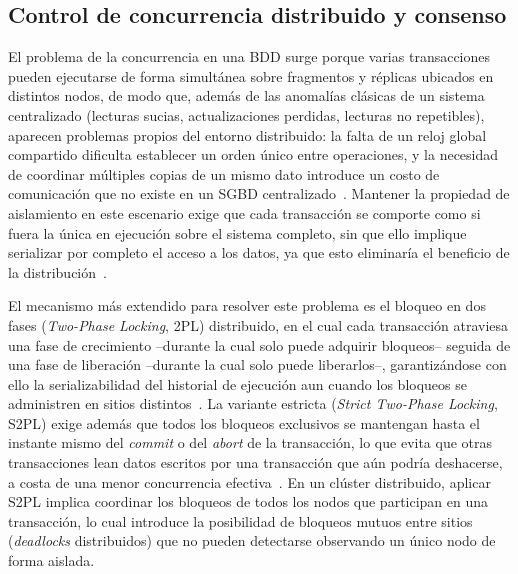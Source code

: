 \documentclass[11pt,a4paper]{article}
\begin{document}
\subsection{Control de concurrencia distribuido y consenso}

El problema de la concurrencia en una BDD surge porque varias transacciones
pueden ejecutarse de forma simult\'anea sobre fragmentos y r\'eplicas
ubicados en distintos nodos, de modo que, adem\'as de las anomal\'ias
cl\'asicas de un sistema centralizado (lecturas sucias, actualizaciones
perdidas, lecturas no repetibles), aparecen problemas propios del entorno
distribuido: la falta de un reloj global compartido dificulta establecer un
orden \'unico entre operaciones, y la necesidad de coordinar m\'ultiples
copias de un mismo dato introduce un costo de comunicaci\'on que no existe
en un SGBD centralizado~\cite{hasan2025,ozsu2020,vansteen2017}. Mantener la propiedad de
aislamiento en este escenario exige que cada transacci\'on se comporte como
si fuera la \'unica en ejecuci\'on sobre el sistema completo, sin que ello
implique serializar por completo el acceso a los datos, ya que esto
eliminar\'ia el beneficio de la distribuci\'on~\cite{hasan2025,vansteen2017}.

El mecanismo m\'as extendido para resolver este problema es el bloqueo en
dos fases (\emph{Two-Phase Locking}, 2PL) distribuido, en el cual cada
transacci\'on atraviesa una fase de crecimiento --durante la cual solo
puede adquirir bloqueos-- seguida de una fase de liberaci\'on --durante la
cual solo puede liberarlos--, garantiz\'andose con ello la serializabilidad
del historial de ejecuci\'on aun cuando los bloqueos se administren en
sitios distintos~\cite{ozsu2020,hasan2025}. La variante estricta (\emph{Strict
Two-Phase Locking}, S2PL) exige adem\'as que todos los bloqueos exclusivos se
mantengan hasta el instante mismo del \emph{commit} o del \emph{abort} de la
transacci\'on, lo que evita que otras transacciones lean datos escritos por
una transacci\'on que a\'un podr\'ia deshacerse, a costa de una menor
concurrencia efectiva~\cite{ozsu2020,vansteen2017}. En un cl\'uster distribuido, aplicar
S2PL implica coordinar los bloqueos de todos los nodos que participan en una
transacci\'on, lo cual introduce la posibilidad de bloqueos mutuos entre
sitios (\emph{deadlocks} distribuidos) que no pueden detectarse observando un
\'unico nodo de forma aislada.
\end{document}
